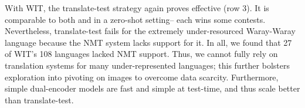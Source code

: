         \begin{table}
          \centering
        \caption{XTD zero-shot Text{$\rightarrow$}Image Recall@10. }
        \label{tab:xtd10}
        \end{table}
        
        With WIT, the translate-test strategy again proves effective (row 3). It is comparable to both \muralbase and \alignmling in a zero-shot setting-- each wins some contests. Nevertheless, translate-test fails for the extremely under-resourced Waray-Waray language because the NMT system lacks support for it. In all, we found that 27 of WIT's 108 languages lacked NMT support. Thus, we cannot fully rely on translation systems for many under-represented languages; this further bolsters exploration into pivoting on images to overcome data scarcity. Furthermore, simple dual-encoder models are fast and simple at test-time, and thus scale better than translate-test. 
        
